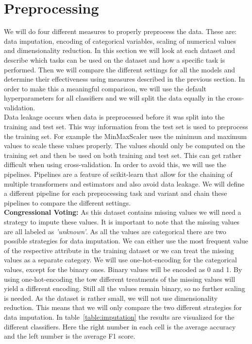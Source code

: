 \documentclass[a4paper,10pt]{article}
\begin{document}
\section{Preprocessing}
\label{sec:preprocessing}
We will do four different measures to properly preprocess the data. These are: data imputation, encoding of categorical variables,
scaling of numerical values and dimensionality reduction. In this section we will look at each dataset and 
describe which tasks can be used on the dataset and how a specific task is performed. Then we will compare the different
settings for all the models and determine their effectiveness using measures described in the previous section. 
In order to make this a meaningful comparison, we will use the default hyperparameters for all classifiers and 
we will split the data equally in the cross-validation.\\
Data leakage occurs when data is preprocessed before it was split into the training and test set. This way information 
from the test set is used to preprocess the training set. For example the MinMaxScaler uses the minimun and maximum values 
to scale these values properly. The values should only be computed on the training set and then be used on both training and 
test set. This can get rather difficult when using cross-validation. In order to avoid this, we will use the pipelines.    
Pipelines are a feature of scikit-learn that allow for the chaining of multiple transformers and estimators and also avoid 
data leakage. We will define a different pipeline for each preprocessing task and variant and chain these pipelines to compare 
the different settings.\\
\textbf{Congressional Voting:} As this dataset contains missing values we will need a strategy to impute these values. 
It is important to note that the missing values are all labeled as \textit{'unknown'}.
As all the values are categorical there are two possible strategies for data imputation.
We can either use the most frequent value of the respective attribute in the training dataset
or we can treat the missing values as a separate category. We will use one-hot-encoding for the categorical values,
except for the binary ones. Binary values will be encoded as 0 and 1. By using one-hot-encoding
the tow different treatments of the missing values will yield a different encoding. Still all the values remain binary, 
so no further scaling is needed. As the dataset is rather small, we will not use dimensionality reduction. This means
that we will only compare the two different strategies for data imputation.
In table~\ref{table:imputation} the results are visualized for the different classifiers.
Here the right number in each cell is the average accuracy and the left number is the average F1 score.
\end{document}
